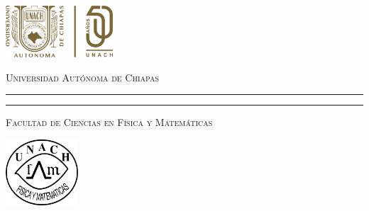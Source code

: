\begin{titlepage}
\hspace{-1.7cm} %
\begin{minipage}[t][0.03\textheight][c]{0.22\textwidth}
        \includegraphics[width=4.0cm]{FCFM-UNACH.png}
\end{minipage}\hspace{0.9cm}
\begin{minipage}[t][0.03\textheight][c]{0.69\textwidth}
\begin{center}
                \textsc{\huge Universidad Autónoma de Chiapas}\\[0.3cm]
                \hrule height 2.5pt
                \vspace{0.2cm}
                \hrule height1pt
                \vspace{0.3cm}
                \textsc{\Large Facultad de Ciencias en Física y Matemáticas}
\end{center}
\end{minipage}\hspace{0.2cm}
\begin{minipage}[t][0.03\textheight][c]{0.2\textwidth}
		\includegraphics[width=2.7cm]{logofcfm.png}
\end{minipage}\\
\begin{minipage}[t][0.93\textheight][c]{0.06\textwidth}
\vspace{60pt}
    \begin{center}
        \vrule width1pt height18cm
        \vspace{5mm}
        \vrule width2.5pt height18cm
        \vspace{5mm}
        \vrule width1pt height18cm
   \end{center}
\end{minipage}\hspace{1.3cm} 
\begin{minipage}[t][0.95\textheight][c]{0.76\textwidth}


\end{minipage}
\end{titlepage}
